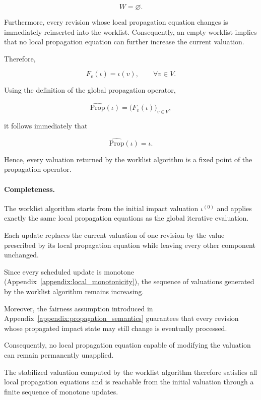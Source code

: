 \documentclass[10pt]{article}
\begin{document}
	\[
	W=\varnothing.
	\]
	
	Furthermore, every revision whose local propagation equation changes is
	immediately reinserted into the worklist. Consequently, an empty worklist
	implies that no local propagation equation can further increase the current
	valuation.
	
	Therefore,
	
	\[
	F_v(\iota)
	=
	\iota(v),
	\qquad
	\forall v\in V.
	\]
	
	Using the definition of the global propagation operator,
	
	\[
	\widehat{\mathrm{Prop}}(\iota)
	=
	\bigl(
	F_v(\iota)
	\bigr)_{v\in V},
	\]
	
	it follows immediately that
	
	\begin{equation}
		\label{eq:worklist_soundness}
		\widehat{\mathrm{Prop}}(\iota)
		=
		\iota.
	\end{equation}
	
	Hence, every valuation returned by the worklist algorithm is a fixed point of
	the propagation operator.
	
	\paragraph{Completeness.}
	
	The worklist algorithm starts from the initial impact valuation
	$\iota^{(0)}$
	and applies exactly the same local propagation equations as the global
	iterative evaluation.
	
	Each update replaces the current valuation of one revision by the value
	prescribed by its local propagation equation while leaving every other
	component unchanged.
	
	Since every scheduled update is monotone
	(Appendix~\ref{appendix:local_monotonicity}),
	the sequence of valuations generated by the worklist algorithm remains
	increasing.
	
	Moreover, the fairness assumption introduced in
	Appendix~\ref{appendix:propagation_semantics}
	guarantees that every revision whose propagated impact state may still change
	is eventually processed.
	
	Consequently, no local propagation equation capable of modifying the valuation
	can remain permanently unapplied.
	
	The stabilized valuation computed by the worklist algorithm therefore satisfies
	all local propagation equations and is reachable from the initial valuation
	through a finite sequence of monotone updates.
	
\end{document}

